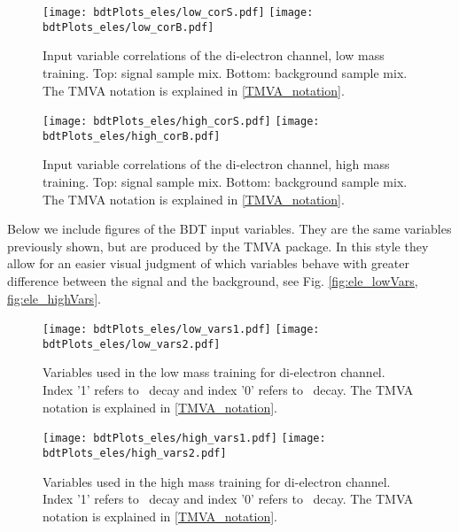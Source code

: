 \begin{figure}[tbp]
\begin{center}
\texttt{[image: bdtPlots\_eles/low\_corS.pdf]}
\texttt{[image: bdtPlots\_eles/low\_corB.pdf]}
\caption[Input variable correlations of the di-electron channel, low mass training.]{ Input variable correlations of the di-electron channel, low mass training. Top: signal sample mix. Bottom: background sample mix. The TMVA notation is explained in \ref{TMVA_notation}.}
\label{fig:ele_cors_low}
\end{center}
\end{figure}

\begin{figure}[tbp]
\begin{center}
\texttt{[image: bdtPlots\_eles/high\_corS.pdf]}
\texttt{[image: bdtPlots\_eles/high\_corB.pdf]}
\caption[Input variable correlations of the di-electron channel, high mass training.]{ Input variable correlations of the di-electron channel, high mass training. Top: signal sample mix. Bottom: background sample mix. The TMVA notation is explained in \ref{TMVA_notation}.}
\label{fig:ele_cors_high}
\end{center}
\end{figure}

Below we include figures of the BDT input variables. They are the same variables previously shown, but are produced by the TMVA package. In this style they allow for an easier visual judgment of which variables behave with greater difference between the signal and the background, see Fig. \ref{fig:ele_lowVars, fig:ele_highVars}.

\begin{figure}[H]
\begin{center}
\texttt{[image: bdtPlots\_eles/low\_vars1.pdf]}
\texttt{[image: bdtPlots\_eles/low\_vars2.pdf]}
\caption[Variables used in the low mass training for di-electron channel.]{ Variables used in the low mass training for di-electron channel. Index '1' refers to \HBB~decay and index '0' refers to \HZZ~decay. The TMVA notation is explained in \ref{TMVA_notation}.}
\label{fig:ele_lowVars}
\end{center}
\end{figure}

\begin{figure}[H]
\begin{center}
\texttt{[image: bdtPlots\_eles/high\_vars1.pdf]}
\texttt{[image: bdtPlots\_eles/high\_vars2.pdf]}
\caption[Variables used in the high mass training for di-electron channel.]{ Variables used in the high mass training for di-electron channel. Index '1' refers to \HBB~decay and index '0' refers to \HZZ~decay. The TMVA notation is explained in \ref{TMVA_notation}.}
\label{fig:ele_highVars}
\end{center}
\end{figure}

